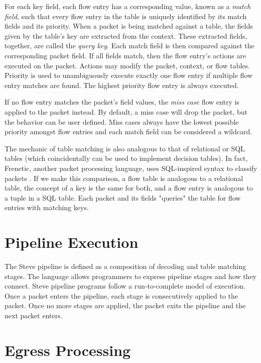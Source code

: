 For each key field, each flow entry has a corresponding value, known as a
\emph{match field}, such that every flow entry in the table is uniquely
identified by its match fields and its priority. When a packet is being matched
against a table, the fields given by the table's key are extracted from the
context. These extracted fields, together, are called the \emph{query key}.
Each match field is then compared against the corresponding packet field. If all
fields match, then the flow entry's actions are executed on the packet. Actions
may modify the packet, context, or flow tables. Priority is used to
unambiguously execute exactly one flow entry if multiple flow entry matches are
found. The highest priority flow entry is always executed.



If no flow entry matches the packet's field values, the \emph{miss case} flow
entry is applied to the packet instead. By default, a miss case will drop the
packet, but the behavior can be user defined. Miss cases always have the lowest
possible priority amongst flow entries and each match field can be considered a
wildcard.

The mechanic of table matching is also analogous to that of relational or SQL
tables (which coincidentally can be used to implement decision tables). In fact,
Frenetic, another packet processing language, uses SQL-inspired syntax to
classify packets \cite{foster2011frenetic, foster2013frenetic}. If we make this
comparison, a flow table is analogous to a relational table, the concept of a
key is the same for both, and a flow entry is analogous to a tuple in a SQL
table. Each packet and its fields "queries" the table for flow entries with
matching keys.

\section{Pipeline Execution}

The Steve pipeline is defined as a composition of decoding and table matching
stages. The language allows programmers to express
pipeline stages and how they connect.
Steve pipeline programs follow a run-to-complete model of execution. Once a
packet enters the pipeline, each stage is consecutively applied to
the packet. Once no more stages are applied, the packet exits the pipeline and
the next packet enters.

\section{Egress Processing} \label{egress_desc}

